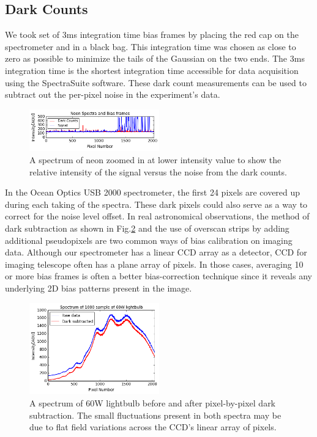 \documentclass[authoryear,12pt,5p,times]{elsarticle}
\begin{document}
  \subsection{Dark Counts}
 We took set of 3ms integration time bias frames by placing the red cap on the spectrometer and in a black bag. This integration time was chosen as close to zero as possible to minimize the tails of the Gaussian on the two ends. The 3ms integration time is the shortest integration time accessible for data acquisition using the SpectraSuite software. These dark count measurements can be used to subtract out the per-pixel noise in the experiment's data.
 \begin{figure}[h!]
\includegraphics[width=0.5\textwidth]{figures/dark}
\caption{A spectrum of neon zoomed in at lower intensity value to show the relative intensity of the signal versus the noise from the dark counts.} 
\label{dark_neon}
\end{figure}


In the Ocean Optics USB 2000 spectrometer, the first 24 pixels are covered up during each taking of the spectra. These dark pixels could also serve as a way to correct for the noise level offset. In real astronomical observations, the method of dark subtraction as shown in Fig.\ref{60W} and the use of overscan strips by adding additional pseudopixels are two common ways of bias calibration on imaging data. Although our spectrometer has a linear CCD array as a detector, CCD for imaging telescope often has a plane array of pixels. In those cases, averaging 10 or more bias frames is often a better bias-correction technique since it reveals any underlying 2D bias patterns present in the image.
 \begin{figure}[h!]
\includegraphics[width=0.5\textwidth]{figures/60Wdarksubtracted}
\caption{A spectrum of 60W lightbulb before and after pixel-by-pixel dark subtraction. The small fluctuations present in both spectra may be due to flat field variations across the CCD's linear array of pixels.} 
\label{60W}
\end{figure}
\end{document}
